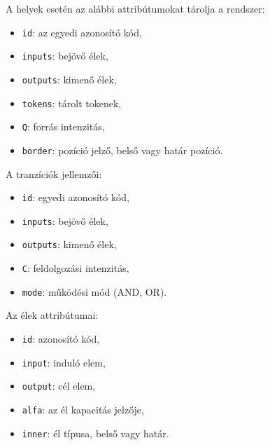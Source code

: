A helyek esetén az alábbi attribútumokat tárolja a rendszer:
\begin{itemize}
\item \texttt{id}: az egyedi azonosító kód,
\item \texttt{inputs}: bejövő élek,
\item \texttt{outputs}: kimenő élek,
\item \texttt{tokens}: tárolt tokenek,
\item \texttt{Q}: forrás intenzitás,
\item \texttt{border}: pozíció jelző, belső vagy határ pozíció.
\end{itemize}        
A tranzíciók jellemzői:
\begin{itemize}
\item \texttt{id}: egyedi azonosító kód,
\item \texttt{inputs}: bejövő élek,
\item \texttt{outputs}: kimenő élek,
\item \texttt{C}: feldolgozási intenzitás,
\item \texttt{mode}: működési mód (AND, OR).
\end{itemize}
Az élek attribútumai:
\begin{itemize}
\item \texttt{id}: azonosító kód,
\item \texttt{input}: induló elem,
\item \texttt{output}: cél elem,
\item \texttt{alfa}: az él kapacitás jelzője,
\item \texttt{inner}: él típusa, belső vagy határ.
\end{itemize}

